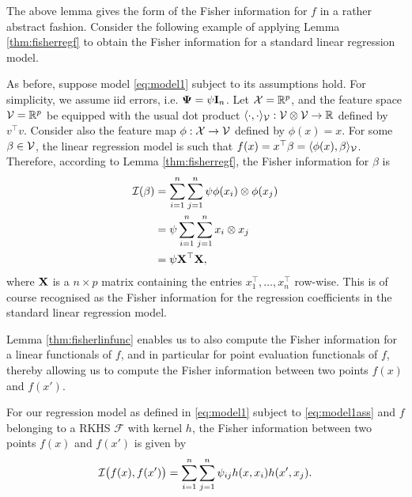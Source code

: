 \documentclass[a4paper,showframe,11pt,draft]{report}
\begin{document}
The above lemma gives the form of the Fisher information for $f$ in a rather abstract fashion.
Consider the following example of applying Lemma \eqref{thm:fisherregf} to obtain the Fisher information for a standard linear regression model.

\begin{example}
  As before, suppose model \eqref{eq:model1} subject to its assumptions hold.
  For simplicity, we assume iid errors, i.e. ${\bm\Psi} = \psi {\mathbf I}_n$.
  Let ${\mathcal X} = \mathbb{R}^p$, and the feature space ${\mathcal V} = \mathbb{R}^p$ be equipped with the usual dot product $\langle\cdot,\cdot\rangle_{\mathcal V}:{\mathcal V} \otimes {\mathcal V} \to \mathbb{R}$ defined by $v^\top v$.
  Consider also the feature map $\phi:{\mathcal X} \to {\mathcal V}$ defined by $\phi(x)=x$.
  For some $\beta \in {\mathcal V}$, the linear regression model is such that $f(x) = x^\top \beta = \langle\phi(x),\beta\rangle_{\mathcal V}$.
  Therefore, according to Lemma \eqref{thm:fisherregf}, the Fisher information for $\beta$ is
  \begin{align*}
    {\mathcal I}(\beta) 
    &= \sum_{i=1}^n\sum_{j=1}^n \psi \phi(x_i) \otimes \phi(x_j) \\
    &= \psi \sum_{i=1}^n\sum_{j=1}^n x_i \otimes x_j \\
    &= \psi {\mathbf X}^\top {\mathbf X},
  \end{align*}
  where ${\mathbf X}$ is a $n \times p$ matrix containing the entries $x_1^\top,\dots,x_n^\top$ row-wise.
  This is of course recognised as the Fisher information for the regression coefficients in the standard linear regression model.
\end{example}

Lemma \ref{thm:fisherlinfunc} enables us to also compute the Fisher information for a linear functionals of $f$, and in particular for point evaluation functionals of $f$, thereby allowing us to compute the Fisher information between two points $f(x)$ and $f(x')$.

\begin{corollary}\label{thm:fisherreglinfunc}
	For our regression model as defined in \eqref{eq:model1} subject to \eqref{eq:model1ass} and $f$ belonging to a RKHS $\mathcal F$ with kernel $h$, the Fisher information between two points $f(x)$ and $f(x')$ is given by
	\[
		{\mathcal I}\big(f(x),f(x')\big) = \sum_{i=1}^n\sum_{j=1}^n \psi_{ij} h(x,x_i)h(x',x_j).
	\]
\end{corollary}
\end{document}
